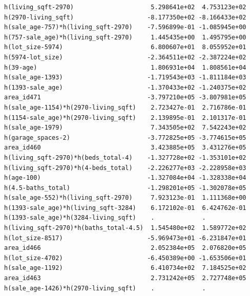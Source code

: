 \documentclass[
]{article}
\begin{document}
\begin{verbatim}
h(living_sqft-2970)                     5.298641e+02  4.753123e+02
h(2970-living_sqft)                    -8.177350e+02 -8.166433e+02
h(sale_age-757)*h(living_sqft-2970)    -7.596899e-01 -1.085945e+00
h(757-sale_age)*h(living_sqft-2970)     1.445435e+00  1.495795e+00
h(lot_size-5974)                        6.800607e+01  8.055952e+01
h(5974-lot_size)                       -2.364511e+02 -2.387224e+02
h(39-age)                               1.806931e+04  1.808561e+04
h(sale_age-1393)                       -1.719543e+03 -1.811184e+03
h(1393-sale_age)                       -1.370433e+02 -1.240375e+02
area_id471                             -3.797210e+05 -3.807981e+05
h(sale_age-1154)*h(2970-living_sqft)    2.723427e-01  2.716786e-01
h(1154-sale_age)*h(2970-living_sqft)    2.139895e-01  2.101317e-01
h(sale_age-1979)                        7.343505e+02  7.542243e+02
h(garage_spaces-2)                     -3.772825e+05 -3.774615e+05
area_id460                              3.423885e+05  3.431276e+05
h(living_sqft-2970)*h(beds_total-4)    -1.327728e+02 -1.353101e+02
h(living_sqft-2970)*h(4-beds_total)    -2.226277e+03 -2.228958e+03
h(age-100)                             -1.327084e+04 -1.328338e+04
h(4.5-baths_total)                     -1.298201e+05 -1.302078e+05
h(sale_age-552)*h(living_sqft-2970)     7.923123e-01  1.111368e+00
h(1393-sale_age)*h(living_sqft-3284)    6.172102e-01  6.424762e-01
h(1393-sale_age)*h(3284-living_sqft)    .             .           
h(living_sqft-2970)*h(baths_total-4.5)  1.545480e+02  1.589772e+02
h(lot_size-8517)                       -5.969473e+01 -6.231847e+01
area_id466                              2.052384e+05  2.076820e+05
h(lot_size-4702)                       -6.450389e+00 -1.653506e+01
h(sale_age-1192)                        6.410734e+02  7.184525e+02
area_id463                              2.731242e+05  2.727748e+05
h(sale_age-1426)*h(2970-living_sqft)    .             .           
                                                                  

\end{verbatim}
\end{document}
